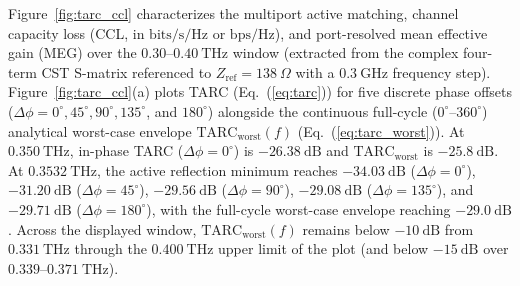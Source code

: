 \documentclass[referee,pdflatex,sn-mathphys-ay]{sn-jnl}
\begin{document}
Figure~\ref{fig:tarc_ccl} characterizes the multiport active matching, channel capacity loss (CCL, in $\mathrm{bits/s/Hz}$ or $\mathrm{bps/Hz}$), and port-resolved mean effective gain (MEG) over the \(0.30\)--\(0.40~\mathrm{THz}\) window (extracted from the complex four-term CST S-matrix referenced to $Z_{\mathrm{ref}} = 138~\Omega$ with a $0.3~\mathrm{GHz}$ frequency step). Figure~\ref{fig:tarc_ccl}(a) plots TARC (Eq.~(\ref{eq:tarc})) for five discrete phase offsets (\(\Delta\phi = 0^{\circ}, 45^{\circ}, 90^{\circ}, 135^{\circ}\), and \(180^{\circ}\)) alongside the continuous full-cycle ($0^{\circ}$--$360^{\circ}$) analytical worst-case envelope $\mathrm{TARC}_{\mathrm{worst}}(f)$ (Eq.~(\ref{eq:tarc_worst})). At $0.350~\mathrm{THz}$, in-phase TARC ($\Delta\phi = 0^{\circ}$) is \(-26.38~\mathrm{dB}\) and $\mathrm{TARC}_{\mathrm{worst}}$ is \(-25.8~\mathrm{dB}\). At \(0.3532~\mathrm{THz}\), the active reflection minimum reaches \(-34.03~\mathrm{dB}\) (\(\Delta\phi = 0^{\circ}\)), \(-31.20~\mathrm{dB}\) (\(\Delta\phi = 45^{\circ}\)), \(-29.56~\mathrm{dB}\) (\(\Delta\phi = 90^{\circ}\)), \(-29.08~\mathrm{dB}\) (\(\Delta\phi = 135^{\circ}\)), and \(-29.71~\mathrm{dB}\) (\(\Delta\phi = 180^{\circ}\)), with the full-cycle worst-case envelope reaching \(-29.0~\mathrm{dB}\). Across the displayed window, $\mathrm{TARC}_{\mathrm{worst}}(f)$ remains below \(-10~\mathrm{dB}\) from \(0.331~\mathrm{THz}\) through the \(0.400~\mathrm{THz}\) upper limit of the plot (and below \(-15~\mathrm{dB}\) over \(0.339\)--\(0.371~\mathrm{THz}\)).
\end{document}
